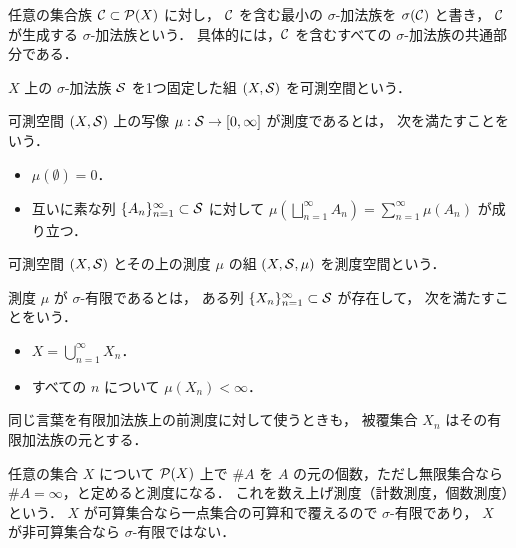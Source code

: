 \begin{definition}\label{def:generated-sigma-algebra}
任意の集合族 $\mathcal C\subset\mathcal P(X)$ に対し，
$\mathcal C$ を含む最小の $\sigma$-加法族を $\sigma(\mathcal C)$ と書き，
$\mathcal C$ が生成する $\sigma$-加法族という．
具体的には，$\mathcal C$ を含むすべての $\sigma$-加法族の共通部分である．
\end{definition}

\begin{definition}[可測空間]
$X$ 上の $\sigma$-加法族 $\mathcal S$ を1つ固定した組 $(X,\mathcal S)$ を可測空間という．
\end{definition}

\begin{definition}[測度]\label{def:measure}
可測空間 $(X,\mathcal S)$ 上の写像 $\mu:\mathcal S\to[0,\infty]$ が測度であるとは，
次を満たすことをいう．
\begin{itemize}
    \item $\mu(\emptyset)=0$．
    \item 互いに素な列 $\{A_n\}_{n=1}^{\infty}\subset\mathcal S$ に対して
    $\mu(\bigsqcup_{n=1}^{\infty}A_n)=\sum_{n=1}^{\infty}\mu(A_n)$
    が成り立つ．
\end{itemize}
\end{definition}

\begin{definition}[測度空間]
可測空間 $(X,\mathcal S)$ とその上の測度 $\mu$ の組 $(X,\mathcal S,\mu)$ を測度空間という．
\end{definition}

\begin{definition}\label{def:sigma-finite-measure}
測度 $\mu$ が $\sigma$-有限であるとは，
ある列 $\{X_n\}_{n=1}^{\infty}\subset\mathcal S$ が存在して，
次を満たすことをいう．
\begin{itemize}
    \item $X=\bigcup_{n=1}^{\infty}X_n$．
    \item すべての $n$ について $\mu(X_n)<\infty$．
\end{itemize}
同じ言葉を有限加法族上の前測度に対して使うときも，
被覆集合 $X_n$ はその有限加法族の元とする．
\end{definition}

\begin{example}[数え上げ測度]\label{ex:counting-measure}
任意の集合 $X$ について $\mathcal P(X)$ 上で
$\#A$ を $A$ の元の個数，ただし無限集合なら $\#A=\infty$，と定めると測度になる．
これを数え上げ測度（計数測度，個数測度）という．
$X$ が可算集合なら一点集合の可算和で覆えるので $\sigma$-有限であり，
$X$ が非可算集合なら $\sigma$-有限ではない．
\end{example}

